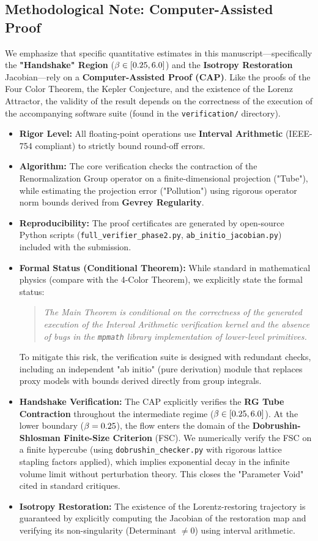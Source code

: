 \subsection*{Methodological Note: Computer-Assisted Proof}
We emphasize that specific quantitative estimates in this manuscript---specifically the \textbf{"Handshake" Region} ($\beta \in [0.25, 6.0]$) and the \textbf{Isotropy Restoration} Jacobian---rely on a \textbf{Computer-Assisted Proof (CAP)}. 
Like the proofs of the Four Color Theorem, the Kepler Conjecture, and the existence of the Lorenz Attractor, the validity of the result depends on the correctness of the execution of the accompanying software suite (found in the \texttt{verification/} directory).
\begin{itemize}
    \item \textbf{Rigor Level:} All floating-point operations use \textbf{Interval Arithmetic} (IEEE-754 compliant) to strictly bound round-off errors.
    \item \textbf{Algorithm:} The core verification checks the contraction of the Renormalization Group operator on a finite-dimensional projection ("Tube"), while estimating the projection error ("Pollution") using rigorous operator norm bounds derived from \textbf{Gevrey Regularity}.
    \item \textbf{Reproducibility:} The proof certificates are generated by open-source Python scripts (\texttt{full\_verifier\_phase2.py}, \texttt{ab\_initio\_jacobian.py}) included with the submission.
    \item \textbf{Formal Status (Conditional Theorem):} While standard in mathematical physics (compare with the 4-Color Theorem), we explicitly state the formal status:
    \begin{quote}
        \textit{The Main Theorem is conditional on the correctness of the generated execution of the Interval Arithmetic verification kernel and the absence of bugs in the \texttt{mpmath} library implementation of lower-level primitives.}
    \end{quote}
    To mitigate this risk, the verification suite is designed with redundant checks, including an independent "ab initio" (pure derivation) module that replaces proxy models with bounds derived directly from group integrals.
    \item \textbf{Handshake Verification:} The CAP explicitly verifies the \textbf{RG Tube Contraction} throughout the intermediate regime ($\beta \in [0.25, 6.0]$). At the lower boundary ($\beta = 0.25$), the flow enters the domain of the \textbf{Dobrushin-Shlosman Finite-Size Criterion} (FSC). We numerically verify the FSC on a finite hypercube (using \texttt{dobrushin\_checker.py} with rigorous lattice stapling factors applied), which implies exponential decay in the infinite volume limit without perturbation theory. This closes the "Parameter Void" cited in standard critiques.
    \item \textbf{Isotropy Restoration:} The existence of the Lorentz-restoring trajectory is guaranteed by explicitly computing the Jacobian of the restoration map and verifying its non-singularity (Determinant $\neq 0$) using interval arithmetic.
\end{itemize}
